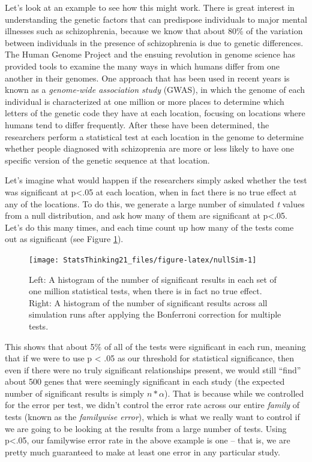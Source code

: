 \documentclass[
  12pt,
]{book}
\begin{document}
Let's look at an example to see how this might work. There is great interest in understanding the genetic factors that can predispose individuals to major mental illnesses such as schizophrenia, because we know that about 80\% of the variation between individuals in the presence of schizophrenia is due to genetic differences. The Human Genome Project and the ensuing revolution in genome science has provided tools to examine the many ways in which humans differ from one another in their genomes. One approach that has been used in recent years is known as a \emph{genome-wide association study} (GWAS), in which the genome of each individual is characterized at one million or more places to determine which letters of the genetic code they have at each location, focusing on locations where humans tend to differ frequently. After these have been determined, the researchers perform a statistical test at each location in the genome to determine whether people diagnosed with schizoprenia are more or less likely to have one specific version of the genetic sequence at that location.

Let's imagine what would happen if the researchers simply asked whether the test was significant at p\textless.05 at each location, when in fact there is no true effect at any of the locations. To do this, we generate a large number of simulated \emph{t} values from a null distribution, and ask how many of them are significant at p\textless.05. Let's do this many times, and each time count up how many of the tests come out as significant (see Figure \ref{fig:nullSim}).

\begin{figure}
\texttt{[image: StatsThinking21\_files/figure-latex/nullSim-1]} \caption{Left: A histogram of the number of significant results in each set of one million statistical tests, when there is in fact no true effect. Right: A histogram of the number of significant results across all simulation runs after applying the Bonferroni correction for multiple tests.}\label{fig:nullSim}
\end{figure}

This shows that about 5\% of all of the tests were significant in each run, meaning that if we were to use p \textless{} .05 as our threshold for statistical significance, then even if there were no truly significant relationships present, we would still ``find'' about 500 genes that were seemingly significant in each study (the expected number of significant results is simply \(n * \alpha\)). That is because while we controlled for the error per test, we didn't control the error rate across our entire \emph{family} of tests (known as the \emph{familywise error}), which is what we really want to control if we are going to be looking at the results from a large number of tests. Using p\textless.05, our familywise error rate in the above example is one -- that is, we are pretty much guaranteed to make at least one error in any particular study.
\end{document}
